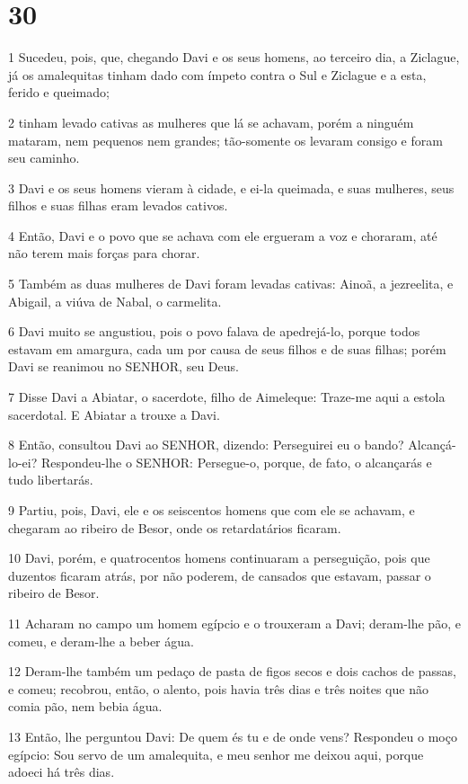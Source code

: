 \chapter{30}

\par 1 Sucedeu, pois, que, chegando Davi e os seus homens, ao terceiro dia, a Ziclague, já os amalequitas tinham dado com ímpeto contra o Sul e Ziclague e a esta, ferido e queimado;
\par 2 tinham levado cativas as mulheres que lá se achavam, porém a ninguém mataram, nem pequenos nem grandes; tão-somente os levaram consigo e foram seu caminho.
\par 3 Davi e os seus homens vieram à cidade, e ei-la queimada, e suas mulheres, seus filhos e suas filhas eram levados cativos.
\par 4 Então, Davi e o povo que se achava com ele ergueram a voz e choraram, até não terem mais forças para chorar.
\par 5 Também as duas mulheres de Davi foram levadas cativas: Ainoã, a jezreelita, e Abigail, a viúva de Nabal, o carmelita.
\par 6 Davi muito se angustiou, pois o povo falava de apedrejá-lo, porque todos estavam em amargura, cada um por causa de seus filhos e de suas filhas; porém Davi se reanimou no SENHOR, seu Deus.
\par 7 Disse Davi a Abiatar, o sacerdote, filho de Aimeleque: Traze-me aqui a estola sacerdotal. E Abiatar a trouxe a Davi.
\par 8 Então, consultou Davi ao SENHOR, dizendo: Perseguirei eu o bando? Alcançá-lo-ei? Respondeu-lhe o SENHOR: Persegue-o, porque, de fato, o alcançarás e tudo libertarás.
\par 9 Partiu, pois, Davi, ele e os seiscentos homens que com ele se achavam, e chegaram ao ribeiro de Besor, onde os retardatários ficaram.
\par 10 Davi, porém, e quatrocentos homens continuaram a perseguição, pois que duzentos ficaram atrás, por não poderem, de cansados que estavam, passar o ribeiro de Besor.
\par 11 Acharam no campo um homem egípcio e o trouxeram a Davi; deram-lhe pão, e comeu, e deram-lhe a beber água.
\par 12 Deram-lhe também um pedaço de pasta de figos secos e dois cachos de passas, e comeu; recobrou, então, o alento, pois havia três dias e três noites que não comia pão, nem bebia água.
\par 13 Então, lhe perguntou Davi: De quem és tu e de onde vens? Respondeu o moço egípcio: Sou servo de um amalequita, e meu senhor me deixou aqui, porque adoeci há três dias.
